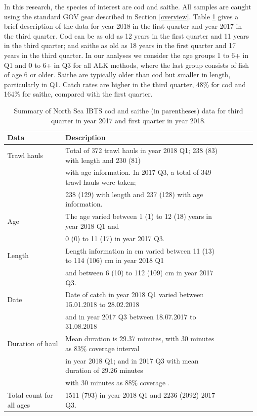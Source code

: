 \documentclass[a4paper 12pt]{article}
\numberwithin{equation}{section}
\begin{document}
In this research, the species of interest are cod and saithe. All samples are caught using the standard GOV gear described in Section \ref{overview}. Table \ref{tab:data2018} gives a brief description of the data for year 2018 in the first quarter and year 2017 in the third quarter.  Cod can be as old as 12 years in the first quarter and 11 years in the third quarter; and saithe as old as 18 years in the first quarter and 17 years in the third quarter. In our analyses we consider the age groups 1 to 6+ in Q1 and 0 to 6+ in Q3 for all ALK methods, where the last group consists of fish of age 6 or older. Saithe are typically older than cod but smaller in length, particularly in Q1. Catch rates are higher in the third quarter, 48\% for cod and 164\% for saithe, compared with the first quarter.\\

\begin{small}
\begin{table}[h!]
\caption{Summary of North Sea IBTS cod and saithe (in parentheses) data for third quarter in year 2017 and first quarter in year 2018.}
\begin{tabular}{llllll}
\toprule
\bf Data&\bf Description \\
\midrule
Trawl hauls  & Total of 372 trawl hauls in year 2018 Q1; 238 (83)  with length and 230 (81) \\ & with age information. In 2017 Q3, a total of 349 trawl hauls were taken; \\ & 238 (129) with length and 237 (128) with age information. \\[1.7ex]

Age &The age varied between 1 (1) to 12 (18) years in year 2018 Q1 and \\ & 0 (0) to 11 (17) in year 2017 Q3. \\[1.7ex]

Length & Length information in cm varied between 11 (13) to 114 (106) cm in year 2018 Q1 \\ & and between 6 (10) to 112 (109) cm in year 2017 Q3. \\[1.7ex]

Date&Date of catch in year 2018 Q1 varied between 15.01.2018 to 28.02.2018 \\ & and in year 2017 Q3 between 18.07.2017 to 31.08.2018 \\[1.7ex]

Duration of haul & Mean duration is 29.37 minutes, with 30 minutes as 83\% coverage interval \\ & in year 2018 Q1; and in 2017 Q3 with mean duration of 29.26 minutes \\ & with 30 minutes as 88\% coverage . \\[1.7ex]

Total count for all ages & 1511 (793) in year 2018 Q1 and 2236 (2092) 2017 Q3. \\[0.5ex]
\bottomrule
\end{tabular}
\label{tab:data2018}
\end{table}
\end{small}
\end{document}
